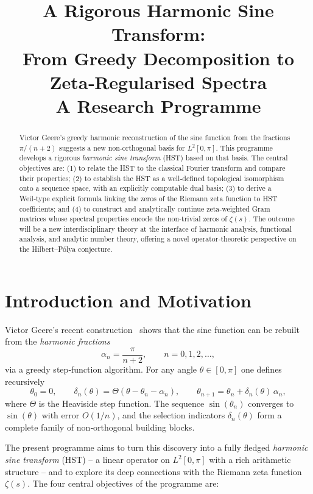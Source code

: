 \documentclass[11pt,a4paper]{article}
\title{A Rigorous Harmonic Sine Transform:\\
From Greedy Decomposition to Zeta‑Regularised Spectra\\
\large A Research Programme}
\author{}
\date{}
\begin{document}
\maketitle

\begin{abstract}
Victor Geere's greedy harmonic reconstruction of the sine function from the fractions \(\pi/(n+2)\) suggests a new non‑orthogonal basis for \(L^2[0,\pi]\). This programme develops a rigorous \emph{harmonic sine transform} (HST) based on that basis. The central objectives are: (1) to relate the HST to the classical Fourier transform and compare their properties; (2) to establish the HST as a well‑defined topological isomorphism onto a sequence space, with an explicitly computable dual basis; (3) to derive a Weil‑type explicit formula linking the zeros of the Riemann zeta function to HST coefficients; and (4) to construct and analytically continue zeta‑weighted Gram matrices whose spectral properties encode the non‑trivial zeros of \(\zeta(s)\). The outcome will be a new interdisciplinary theory at the interface of harmonic analysis, functional analysis, and analytic number theory, offering a novel operator‑theoretic perspective on the Hilbert–Pólya conjecture.
\end{abstract}

\section{Introduction and Motivation}
Victor Geere’s recent construction~\cite{Geere2026a,Geere2026b} shows that the sine function can be rebuilt from the \emph{harmonic fractions}
\[
\alpha_n = \frac{\pi}{n+2}, \qquad n=0,1,2,\dots,
\]
via a greedy step‑function algorithm. For any angle \(\theta\in[0,\pi]\) one defines recursively
\[
\theta_0 = 0,\qquad 
\delta_n(\theta) = \Theta(\theta-\theta_n-\alpha_n),\qquad
\theta_{n+1} = \theta_n + \delta_n(\theta)\,\alpha_n,
\]
where \(\Theta\) is the Heaviside step function. The sequence \(\sin(\theta_n)\) converges to \(\sin(\theta)\) with error \(O(1/n)\), and the selection indicators \(\delta_n(\theta)\) form a complete family of non‑orthogonal building blocks.

The present programme aims to turn this discovery into a fully fledged \emph{harmonic sine transform} (HST) – a linear operator on \(L^2[0,\pi]\) with a rich arithmetic structure – and to explore its deep connections with the Riemann zeta function \(\zeta(s)\). The four central objectives of the programme are:
\end{document}
